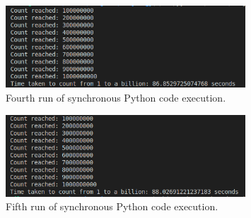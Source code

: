 \documentclass{article}
\begin{document}
\begin{figure}[htbp]
    \centering
    \includegraphics[width=0.8\textwidth]{../records/results_python/result_4.png}
    \caption{Fourth run of synchronous Python code execution.}
    \label{fig:Python-runtime-4}
\end{figure}

\begin{figure}[htbp]
    \centering
    \includegraphics[width=0.8\textwidth]{../records/results_python/result_5.png}
    \caption{Fifth run of synchronous Python code execution.}
    \label{fig:Python-runtime-5}
\end{figure}
\end{document}
